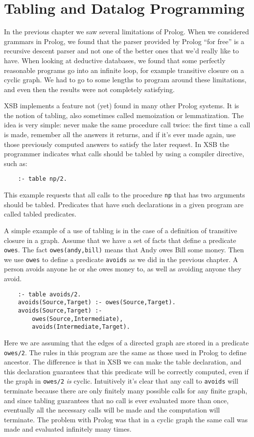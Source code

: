 \chapter{Tabling and Datalog Programming}

In the previous chapter we saw several limitations of Prolog.  When we
considered grammars in Prolog, we found that the parser provided by
Prolog ``for free'' is a recursive descent parser and not one of the
better ones that we'd really like to have.  When looking at deductive
databases, we found that some perfectly reasonable programs go into an
infinite loop, for example transitive closure on a cyclic graph.  We
had to go to some lengths to program around these limitations, and
even then the results were not completely satisfying.

XSB implements a feature not (yet) found in many other Prolog systems.
It is the notion of tabling, also sometimes called memoization or
lemmatization.  The idea is very simple: never make the same procedure
call twice: the first time a call is made, remember all the answers it
returns, and if it's ever made again, use those previously computed
answers to satisfy the later request.  In XSB the programmer indicates
what calls should be tabled by using a compiler directive, such as:
\begin{verbatim}
    :- table np/2.
\end{verbatim}
This example requests that all calls to the procedure \verb|np| that
has two arguments should be tabled.  Predicates that have such
declarations in a given program are called tabled predicates.

A simple example of a use of tabling is in the case of a definition of
transitive closure in a graph.  Assume that we have a set of facts
that define a predicate \verb|owes|.  The fact \verb|owes(andy,bill)|
means that Andy owes Bill some money.  Then we use \verb|owes| to
define a predicate \verb|avoids| as we did in the previous chapter.  A
person avoids anyone he or she owes money to, as well as avoiding
anyone they avoid.

\begin{verbatim}
    :- table avoids/2.
    avoids(Source,Target) :- owes(Source,Target).
    avoids(Source,Target) :-
        owes(Source,Intermediate),
        avoids(Intermediate,Target).
\end{verbatim}
Here we are assuming that the edges of a directed graph are stored in
a predicate \verb|owes/2|.  The rules in this program are the same as
those used in Prolog to define ancestor.  The difference is that in
XSB we can make the table declaration, and this declaration guarantees
that this predicate will be correctly computed, even if the graph in
\verb|owes/2| {\em is} cyclic.  Intuitively it's clear that any call
to \verb|avoids| will terminate because there are only finitely
many possible calls for any finite graph, and since tabling guarantees
that no call is ever evaluated more than once, eventually all the
necessary calls will be made and the computation will terminate.  The
problem with Prolog was that in a cyclic graph the same call was made
and evaluated infinitely many times.


